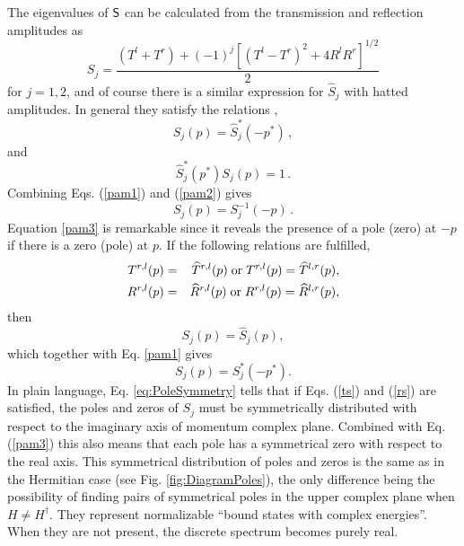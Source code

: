 The eigenvalues of $\sf{S}$ can be calculated from the transmission and reflection amplitudes as
%
\begin{equation}
S_j=\frac{(T^l+T^r)+(-1)^j[(T^l-T^r)^2+4R^lR^r]^{1/2}}{2}
\label{Sform}
\end{equation}
%
for $j=1,2$, and of course there is a similar expression for $\widehat{S}_j$ with hatted amplitudes.
In general they satisfy the relations \cite{Muga2004},
%
\begin{equation}\label{pam1}
S_j(p)=\widehat{S}_j^*(-p^*)\,,
\end{equation}
%
and
%
\begin{equation}\label{pam2}
\widehat{S}_j^*(p^*)S_j(p)=1\,.
\end{equation}
%
Combining Eqs. (\ref{pam1}) and (\ref{pam2}) gives
%
\begin{equation}\label{pam3}
S_j(p)=S^{-1}_j(-p)\,.
\end{equation}
%
Equation \eqref{pam3} is remarkable since it reveals the presence of a pole (zero) at $-p$ if there is a zero (pole) at $p$.
%
If the following relations are fulfilled,
%
\begin{eqnarray}
T^{r,l}(p)&=&\widehat{T}^{r,l}(p)\; {\rm or}\; T^{r,l}(p)=\widehat{T}^{l,r}(p),
\label{ts}
\\
R^{r,l}(p)&=&\widehat{R}^{r,l}(p)\; {\rm or}\; R^{r,l}(p)=\widehat{R}^{l,r}(p),
\label{rs}
\end{eqnarray}
%
then
%
\begin{equation}
S_j(p)=\widehat{S}_j(p),
\end{equation}
%
which together with Eq. \eqref{pam1} gives
%
\begin{equation}
S_j(p)=S_j^*(-p^*).
\label{eq:PoleSymmetry}
\end{equation}
In plain language, Eq. \eqref{eq:PoleSymmetry} tells that if Eqs. (\ref{ts}) and (\ref{rs}) are satisfied,  the poles and zeros of $S_j$ must be symmetrically distributed with respect to the imaginary axis of momentum complex plane. Combined with Eq. (\ref{pam3})
this also means that each pole has a symmetrical zero with respect to the real axis. This symmetrical distribution of poles and zeros is the same as in the Hermitian case (see Fig. \ref{fig:DiagramPoles}),
the only difference being the possibility
of finding pairs of symmetrical poles in the upper complex plane when $H\neq H^\dagger$. They represent normalizable ``bound states
with complex energies''. When they  are not present, the discrete spectrum becomes purely real.

